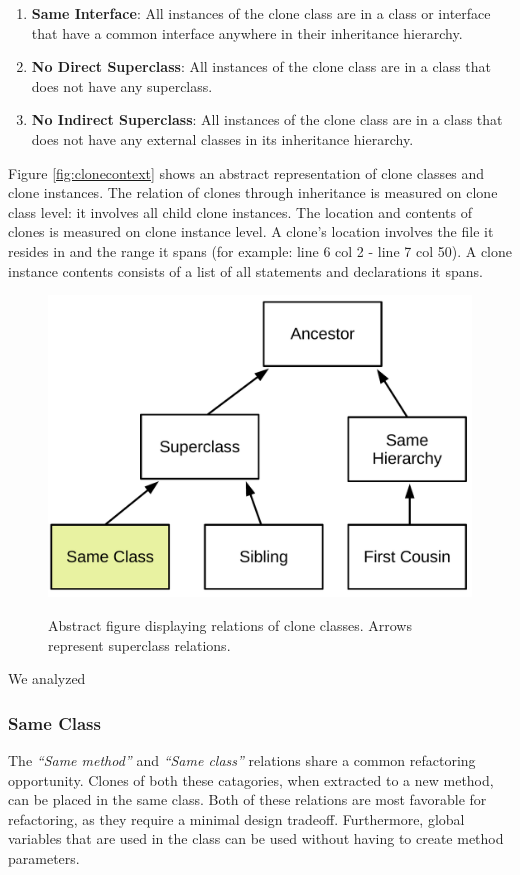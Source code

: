 \begin{enumerate}
\item \textbf{Same Interface}: All instances of the clone class are in a class or interface that have a common interface anywhere in their inheritance hierarchy.
\item \textbf{No Direct Superclass}: All instances of the clone class are in a class that does not have any superclass.
\item \textbf{No Indirect Superclass}: All instances of the clone class are in a class that does not have any external classes in its inheritance hierarchy.
\end{enumerate}

Figure \ref{fig:clonecontext} shows an abstract representation of clone classes and clone instances. The relation of clones through inheritance is measured on clone class level: it involves all child clone instances. The location and contents of clones is measured on clone instance level. A clone's location involves the file it resides in and the range it spans (for example: line 6 col 2 - line 7 col 50). A clone instance contents consists of a list of all statements and declarations it spans.

\begin{figure}[H]
  \caption{Abstract figure displaying relations of clone classes. Arrows represent superclass relations.}
    \medskip
    \includegraphics[width=1\columnwidth]{img/Relation}
  \label{fig:clonerelation}
\end{figure}

We analyzed

\subsubsection{Same Class}
The \textit{``Same method''} and \textit{``Same class''} relations share a common refactoring opportunity. Clones of both these catagories, when extracted to a new method, can be placed in the same class. Both of these relations are most favorable for refactoring, as they require a minimal design tradeoff. Furthermore, global variables that are used in the class can be used without having to create method parameters.

